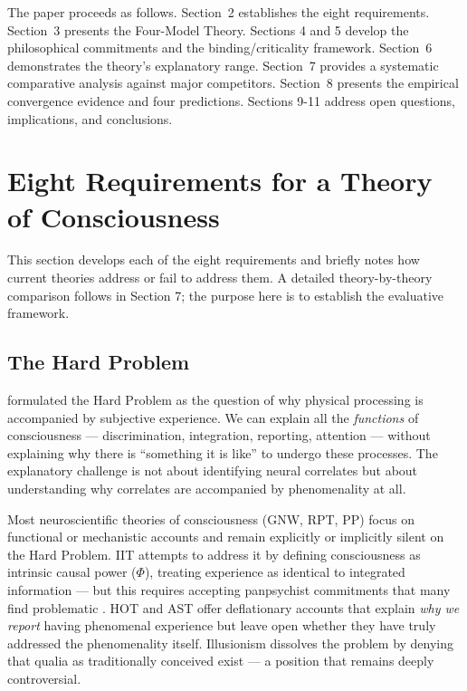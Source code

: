 \documentclass[12pt]{article}
\begin{document}
The paper proceeds as follows. Section~2 establishes the eight requirements. Section~3 presents the Four-Model Theory. Sections 4 and 5 develop the philosophical commitments and the binding/criticality framework. Section~6 demonstrates the theory's explanatory range. Section~7 provides a systematic comparative analysis against major competitors. Section~8 presents the empirical convergence evidence and four predictions. Sections 9-11 address open questions, implications, and conclusions.



\section{Eight Requirements for a Theory of Consciousness}


This section develops each of the eight requirements and briefly notes how current theories address or fail to address them. A detailed theory-by-theory comparison follows in Section 7; the purpose here is to establish the evaluative framework.


\subsection{The Hard Problem}


\citet{Chalmers1995,Chalmers1996} formulated the Hard Problem as the question of why physical processing is accompanied by subjective experience. We can explain all the \emph{functions} of consciousness --- discrimination, integration, reporting, attention --- without explaining why there is ``something it is like'' \citep{Nagel1974} to undergo these processes. The explanatory challenge is not about identifying neural correlates but about understanding why correlates are accompanied by phenomenality at all.

Most neuroscientific theories of consciousness (GNW, RPT, PP) focus on functional or mechanistic accounts and remain explicitly or implicitly silent on the Hard Problem. IIT attempts to address it by defining consciousness as intrinsic causal power ($\Phi$), treating experience as identical to integrated information --- but this requires accepting panpsychist commitments that many find problematic \citep{Aaronson2014,Doerig2019}. HOT and AST offer deflationary accounts that explain \emph{why we report} having phenomenal experience but leave open whether they have truly addressed the phenomenality itself. Illusionism \citep{Dennett1991,Frankish2016} dissolves the problem by denying that qualia as traditionally conceived exist --- a position that remains deeply controversial.
\end{document}

